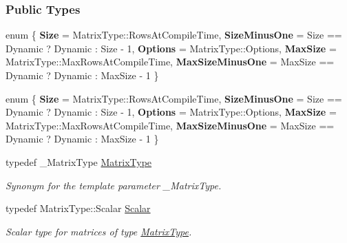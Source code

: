 \subsubsection*{Public Types}
\begin{DoxyCompactItemize}
\item 
\mbox{\label{group___eigenvalues___module_a28067dc326907ab780dcb83ecab8de9c}} 
enum \{ \newline
{\bfseries Size} = Matrix\+Type\+:\+:Rows\+At\+Compile\+Time, 
{\bfseries Size\+Minus\+One} = Size == Dynamic ? Dynamic \+: Size -\/ 1, 
{\bfseries Options} = Matrix\+Type\+:\+:Options, 
{\bfseries Max\+Size} = Matrix\+Type\+:\+:Max\+Rows\+At\+Compile\+Time, 
\newline
{\bfseries Max\+Size\+Minus\+One} = Max\+Size == Dynamic ? Dynamic \+: Max\+Size -\/ 1
 \}
\item 
\mbox{\label{group___eigenvalues___module_aee106dff2d6f438caf9863be0d809ca7}} 
enum \{ \newline
{\bfseries Size} = Matrix\+Type\+:\+:Rows\+At\+Compile\+Time, 
{\bfseries Size\+Minus\+One} = Size == Dynamic ? Dynamic \+: Size -\/ 1, 
{\bfseries Options} = Matrix\+Type\+:\+:Options, 
{\bfseries Max\+Size} = Matrix\+Type\+:\+:Max\+Rows\+At\+Compile\+Time, 
\newline
{\bfseries Max\+Size\+Minus\+One} = Max\+Size == Dynamic ? Dynamic \+: Max\+Size -\/ 1
 \}
\item 
\mbox{\label{group___eigenvalues___module_a93a611350a7db9d1da18f2c828ecea9f}} 
typedef \+\_\+\+Matrix\+Type \hyperlink{group___eigenvalues___module_a93a611350a7db9d1da18f2c828ecea9f}{Matrix\+Type}
\begin{DoxyCompactList}\small\item\em Synonym for the template parameter {\ttfamily \+\_\+\+Matrix\+Type}. \end{DoxyCompactList}\item 
\mbox{\label{group___eigenvalues___module_a9420c36226cae7d92da8308a3f97ac2f}} 
typedef Matrix\+Type\+::\+Scalar \hyperlink{group___eigenvalues___module_a9420c36226cae7d92da8308a3f97ac2f}{Scalar}
\begin{DoxyCompactList}\small\item\em Scalar type for matrices of type \hyperlink{group___eigenvalues___module_a93a611350a7db9d1da18f2c828ecea9f}{Matrix\+Type}. \end{DoxyCompactList}\item 

\end{DoxyCompactItemize}
